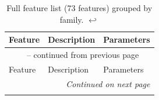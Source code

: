 \documentclass[12pt,a4paper,oneside]{article}
\renewcommand*\thetable{\Roman{table}}
\begin{document}
\begin{longtable}{p{3.5cm}p{7cm}p{2.5cm}}
\caption{Full feature list (73 features) grouped by family. \hyperref[ref:features_call]{$\hookleftarrow$}}
\label{tab:full_features} \\

\toprule
Feature & Description & Parameters \\
\midrule
\endfirsthead

\multicolumn{3}{c}{\tablename\ \thetable{} -- continued from previous page} \\
\toprule
Feature & Description & Parameters \\
\midrule
\endhead

\midrule
\multicolumn{3}{r}{\textit{Continued on next page}} \\
\endfoot

\bottomrule
\endlastfoot


\end{longtable}
\end{document}
